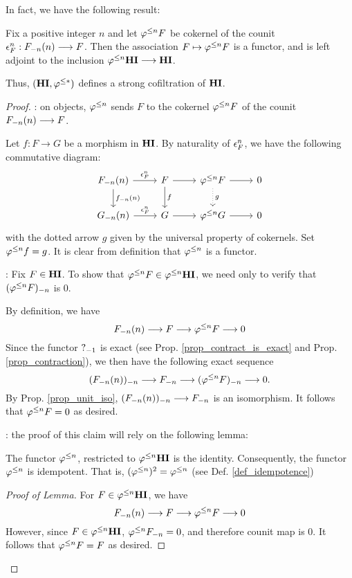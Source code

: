 In fact, we have the following result:

\begin{prop}\label{prop_HI_lower_slice}
Fix a positive integer $n$ and let $\tlHI{n}F$ be cokernel of the 
counit $\cuHI^n_F: \LHI[n]{\RHI[n]{F}} \to F$. Then the 
association $F \mapsto \tlHI{n}F$ is a functor, and is left 
adjoint to the inclusion $\tlHI{n}\HI \to \HI$.

Thus, $(\HI, \tlHI{*})$ defines a strong cofiltration
of $\HI$.
\end{prop}
\begin{proof}
 : on objects, $\tlHI{n}$ sends $F$ to the 
cokernel $\tlHI{n}F$ of the counit $\LHI[n]{\RHI[n]{F}} \to F$.

Let $f: F \to G$ be a morphism in $\HI$.
By naturality of $\cuHI^n_F$, we have the following commutative
diagram:
\[
\begin{tikzcd}
\LHI[n]{\RHI[n]{F}} \arrow{r}{\cuHI_F^n} \arrow{d}{\LHI[n]{\RHI[n]{f}}}
& F \arrow{r} \arrow{d}{f}
& \tlHI{n} F \arrow[dotted]{d}{g} \arrow{r}
& 0 \\
\LHI[n]{\RHI[n]{G}} \arrow{r}{\cuHI_F^n}
& G \arrow{r}
& \tlHI{n}G \arrow{r}
& 0
\end{tikzcd}
\]
with the dotted arrow $g$ given by the universal property of 
cokernels. Set $\tlHI{n}f = g$. It is clear from definition that
$\tlHI{n}$ is a functor.

 : Fix $F \in \HI$. To
show that $\tlHI{n}F \in \tlHI{n}\HI$, we need only to verify
that $\RHI[n]{(\tlHI{n}F)}$ is 0.

By definition, we have
\[
\LHI[n]{\RHI[n]{F}} \to F \to \tlHI{n}F \to 0
\]
Since the functor $\RHI{?}$ is exact (see Prop. 
\ref{prop_contract_is_exact} and Prop. \ref{prop_contraction}), 
we then have the following exact sequence
\[
\RHI[n]{(\LHI[n]{\RHI[n]{F}})} \to \RHI[n]{F} \to
\RHI[n]{(\tlHI{n}F)} \to 0.
\]
By Prop. \ref{prop_unit_iso}, $\RHI[n]{(\LHI[n]{\RHI[n]{F}})}
\to \RHI[n]{F}$ is an isomorphism. It follows that $\tlHI{n}F = 
0$ as desired.

 : the proof
of this claim will rely on the following lemma:

\begin{lem}\label{lem_tlHI_id}
The functor $\tlHI{n}$, restricted to $\tlHI{n}\HI$ is the 
identity. Consequently, the functor $\tlHI{n}$ is idempotent. 
That is, $(\tlHI{n})^2 = \tlHI{n}$ (see Def. \ref{def_idempotence})
\end{lem}
\begin{proof}[Proof of Lemma]
For $F \in \tlHI{n}\HI$, we have
\[
\LHI[n]{\RHI[n]{F}} \to F \to \tlHI{n}F \to 0
\]
However, since $F \in \tlHI{n}\HI$, $\RHI[n]{\tlHI{n}F} = 0$, and 
therefore counit map is $0$. It follows that $\tlHI{n}F = F$ as 
desired.


\end{proof}
\end{proof}

